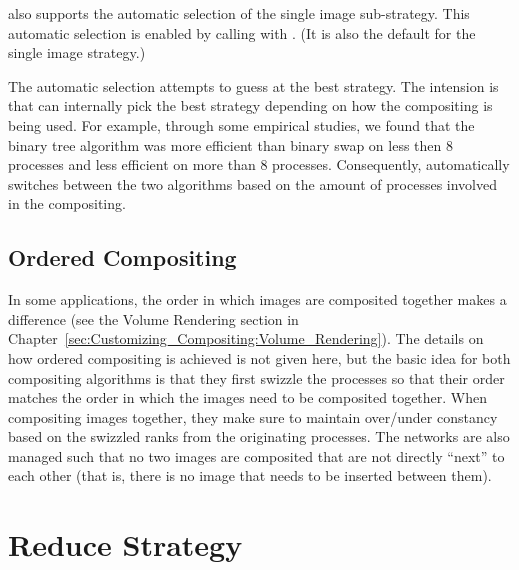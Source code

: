 
\IceT also supports the automatic selection of the single image
sub-strategy.  This automatic selection is enabled by calling
 with
. (It is also the default
for the single image strategy.)

The automatic selection attempts to guess at the best strategy.  The
intension is that \IceT can internally pick the best strategy depending on
how the compositing is being used.  For example, through some empirical
studies, we found that the binary tree algorithm was more efficient than
binary swap on less then 8 processes and less efficient on more than 8
processes.  Consequently, \IceT automatically switches between the two
algorithms based on the amount of processes involved in the compositing.


\subsection{Ordered Compositing}


In some applications, the order in which images are composited together
makes a difference (see the Volume Rendering section in
Chapter~\ref{sec:Customizing_Compositing:Volume_Rendering}).  The details
on how ordered compositing is achieved is not given here, but the basic
idea for both compositing algorithms is that they first swizzle the
processes so that their order matches the order in which the images need to
be composited together.  When compositing images together, they make sure
to maintain over/under constancy based on the swizzled ranks from the
originating processes.  The networks are also managed such that no two
images are composited that are not directly ``next'' to each other (that
is, there is no image that needs to be inserted between them).



\section{Reduce Strategy}
\label{sec:Strategies:Reduce}

